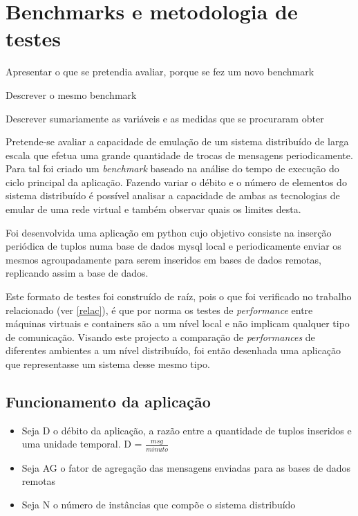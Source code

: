 


\section{Benchmarks e metodologia de testes} \label{benchs}

{ \color{blue} Apresentar o que se pretendia avaliar, porque se fez um novo benchmark

Descrever o mesmo benchmark

Descrever sumariamente as variáveis e as medidas que se procuraram obter}


Pretende-se avaliar a capacidade de emulação de um sistema distribuído de larga escala que efetua uma grande quantidade de trocas de mensagens periodicamente.
Para tal foi criado um \textit{benchmark} baseado na análise do tempo de execução do ciclo principal da aplicação. Fazendo variar o débito e o número de elementos do sistema 
distribuído é possível analisar a capacidade de ambas as tecnologias de emular de uma rede virtual e também observar quais os limites desta. 

Foi desenvolvida uma aplicação em python cujo objetivo consiste na inserção periódica de tuplos numa base de dados mysql local e periodicamente enviar os mesmos agroupadamente para serem inseridos em bases de dados remotas, replicando assim a base de dados. 


Este formato de testes foi construído de raíz, pois o que foi verificado no trabalho relacionado (ver \ref{relac}), é que por norma os testes de \textit{performance} entre máquinas virtuais e containers são a um nível local e não implicam qualquer tipo de comunicação. Visando este projecto a comparação de \textit{performances} de diferentes ambientes a um nível distribuído, foi então desenhada uma aplicação que representasse um sistema desse mesmo tipo.


\subsection{Funcionamento da aplicação} \label{func}

\begin{itemize}

\item Seja D o débito da aplicação, a razão entre a quantidade de tuplos inseridos e uma unidade temporal. D = $\frac{msg}{minuto}$
\item Seja AG o fator de agregação das mensagens enviadas para as bases de dados remotas
\item Seja N o número de instâncias que compõe o sistema distribuído

\end{itemize}


